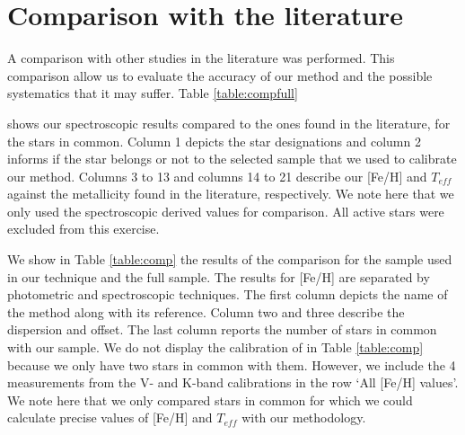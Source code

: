 \documentclass{aa}
\begin{document}
\section{Comparison with the literature}
\label{sec:comp}
A comparison with other studies in the literature was performed. This comparison allow us to evaluate the accuracy of our method and the possible systematics that it may suffer. Table \ref{table:compfull} \addtocounter{table}{1} shows our spectroscopic results compared to the ones found in the literature, for the stars in common. Column 1 depicts the star designations and column 2 informs if the star belongs or not to the selected sample that we used to calibrate our method. Columns 3 to 13 and columns 14 to 21 describe our [Fe/H] and $T_{eff}$ against the metallicity found in the literature, respectively. We note here that we only used the spectroscopic derived values for comparison. All active stars were excluded from this exercise.

We show in Table \ref{table:comp} the results of the comparison for the sample used in our technique and the full sample. The results for [Fe/H] are separated by photometric and spectroscopic techniques. The first column depicts the name of the method along with its reference. Column two and three describe the dispersion and offset. The last column reports the number of stars in common with our sample. We do not display the calibration of \citet{Mann-2013a} in Table \ref{table:comp} because we only have two stars in common with them. However, we include the 4 measurements from the V- and K-band calibrations in the row `All [Fe/H] values'. We note here that we only compared stars in common for which we could calculate precise values of [Fe/H] and $T_{eff}$ with our methodology.
\end{document}
